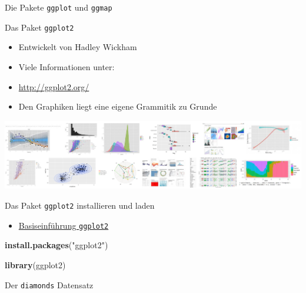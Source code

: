 \documentclass[ignorenonframetext,]{beamer}
\newenvironment{Shaded}{}{}
\newcommand{\KeywordTok}[1]{\textcolor[rgb]{0.00,0.44,0.13}{\textbf{{#1}}}}
\newcommand{\StringTok}[1]{\textcolor[rgb]{0.25,0.44,0.63}{{#1}}}
\newcommand{\NormalTok}[1]{{#1}}
\providecommand{\tightlist}{%
\setlength{\itemsep}{0pt}\setlength{\parskip}{0pt}}
\begin{document}
\begin{frame}[fragile]{Die Pakete \texttt{ggplot} und \texttt{ggmap}}

\begin{block}{Das Paket \texttt{ggplot2}}

\begin{itemize}
\tightlist
\item
  Entwickelt von Hadley Wickham
\item
  Viele Informationen unter:
\item
  \url{http://ggplot2.org/}
\item
  Den Graphiken liegt eine eigene Grammitik zu Grunde
\end{itemize}

\includegraphics{./tex2pdf.9796/7e98fbfb3ac587a4e38146cb5b5e6d7fba26965d.png}

\end{block}

\begin{block}{Das Paket \texttt{ggplot2} installieren und laden}

\begin{itemize}
\tightlist
\item
  \href{www.r-bloggers.com/basic-introduction-to-ggplot2/}{Basiseinführung
  \texttt{ggplot2}}
\end{itemize}

\begin{Shaded}
\begin{Highlighting}[]
\KeywordTok{install.packages}\NormalTok{(}\StringTok{"ggplot2"}\NormalTok{)}
\end{Highlighting}
\end{Shaded}

\begin{Shaded}
\begin{Highlighting}[]
\KeywordTok{library}\NormalTok{(ggplot2)}
\end{Highlighting}
\end{Shaded}

\end{block}

\begin{block}{Der \texttt{diamonds} Datensatz}


\end{block}
\end{frame}
\end{document}
